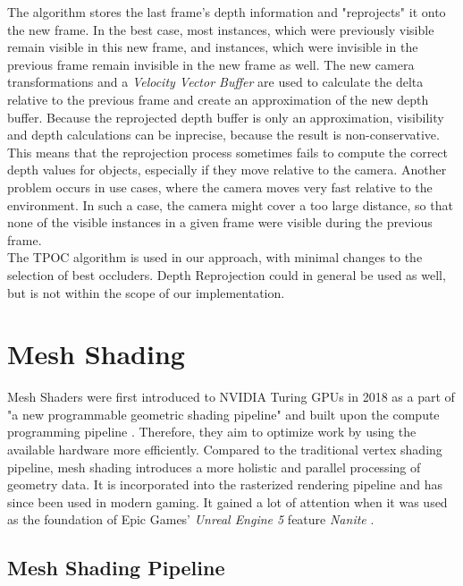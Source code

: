 \noindent
The algorithm stores the last frame's depth information and "reprojects" it onto the new frame. In the best case, 
most instances, which were previously visible remain visible in this new frame, and instances, which were invisible 
in the previous frame remain invisible in the new frame as well. The new camera transformations and a 
\emph{Velocity Vector Buffer} are used to calculate the delta relative to the previous frame and create an 
approximation of the new depth buffer. Because the reprojected depth buffer is only an approximation, visibility 
and depth calculations can be inprecise, because the result is non-conservative. This means that the reprojection 
process sometimes fails to compute the correct depth values for objects, especially if they move relative to the 
camera. Another problem occurs in use cases, where the camera moves very fast relative to the environment. In such 
a case, the camera might cover a too large distance, so that none of the visible instances in a given frame were 
visible during the previous frame. \cite{Kruskonja2022} \\

\noindent
The \ac{TPOC} algorithm is used in our approach, with minimal changes to the selection of best occluders.
Depth Reprojection could in general be used as well, but is not within the scope of our implementation.


\section{Mesh Shading}  \label{sec-mesh-shading}

Mesh Shaders were first introduced to NVIDIA Turing \ac{GPU}s in 2018 as a part of "a new programmable 
geometric shading pipeline" and built upon the compute programming pipeline \cite{Kubisch2018}. 
Therefore, they aim to optimize work by using the available hardware more efficiently. Compared to the 
traditional vertex shading pipeline, mesh shading introduces a more holistic and parallel processing of 
geometry data. It is incorporated into the rasterized rendering pipeline and has since been used in modern 
gaming. It gained a lot of attention when it was used as the foundation of Epic Games' \emph{Unreal Engine 5} 
feature \emph{Nanite} \cite{Karis2021}.\\


\subsection*{Mesh Shading Pipeline} \label{subsec-the-mesh-shading-pipeline}

